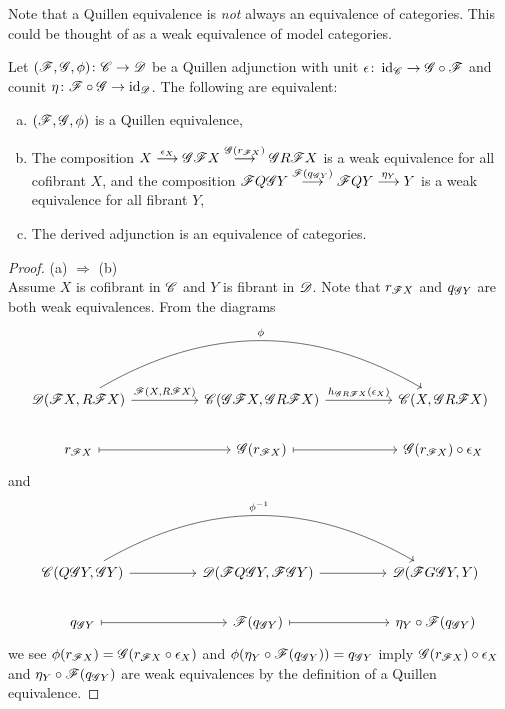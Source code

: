 \documentclass[10pt]{amsart}
\begin{document}
\begin{rmk}
  Note that a Quillen equivalence is {\it not} always an equivalence of categories.
  This could be thought of as a weak equivalence of model categories.
\end{rmk}

\begin{prop}
  Let $(\mathscr{F}, \mathscr{G}, \phi) \colon \mathscr{C} \to \mathscr{D}$ be a Quillen adjunction with unit $\epsilon \colon \operatorname{id}_{\mathscr{C}} \to \mathscr{G} \circ \mathscr{F}$ and counit $\eta \colon \mathscr{F} \circ \mathscr{G} \to \operatorname{id}_{\mathscr{D}}$.
  The following are equivalent:
  \begin{enumerate}[(a)]
  \item
    $(\mathscr{F}, \mathscr{G}, \phi)$ is a Quillen equivalence,
  \item
    The composition 
    $X \overset{\epsilon_X}\longrightarrow \mathscr{G} \mathscr{F} X \overset{\mathscr{G}(r_{\mathscr{F} X})}\longrightarrow \mathscr{G} R \mathscr{F} X$
    is a weak equivalence for all cofibrant $X$, and the composition
    $\mathscr{F} Q \mathscr{G} Y \overset{\mathscr{F}(q_{\mathscr{G} Y})}\longrightarrow \mathscr{F} Q Y \overset{\eta_Y}\longrightarrow Y$ is a weak equivalence for all fibrant $Y$,
  \item
    The derived adjunction is an equivalence of categories.
  \end{enumerate}

  \begin{proof}
    (a) $\Rightarrow$ (b)\\
    Assume $X$ is cofibrant in $\mathscr{C}$ and $Y$ is fibrant in $\mathscr{D}$.
    Note that $r_{\mathscr{F} X}$ and $q_{\mathscr{G} Y}$ are both weak equivalences.
    From the diagrams
    $$\begin{tikzcd}      
      \D(\F X, R \F X)\arrow{rr}{\F(X, R \F X)}\arrow[bend left]{rrrr}{\phi} 
      && 
      \C(\G \F X, \G R \F X) \arrow{rr}{h_{\G R \F X}(\epsilon_X)} && 
      \C(X, \G R \F X)\\
      r_{\F X} \arrow[mapsto]{rr} && \G(r_{\F X}) \arrow[mapsto]{rr} & & \G(r_{\F X}) \circ \epsilon _X
    \end{tikzcd}$$
    and
    $$\begin{tikzcd}
      \C(Q\G Y, \G Y) \arrow{rr}\arrow[bend left]{rrrr}{\phi^{-1}} && \D(\F Q \G Y, \F \G Y) \arrow{rr} && \D(\F G \G Y, Y)\\
      q_{\G Y} \arrow[mapsto]{rr} && \F(q_{\G Y}) \arrow[mapsto]{rr} && \eta_{Y} \circ \F(q_{\G Y})
    \end{tikzcd}$$
    we see $\phi(r_{\mathscr{F} X}) = \mathscr{G}(r_{\mathscr{F} X} \circ \epsilon_X)$ and $\phi(\eta_Y \circ \mathscr{F}(q_{\mathscr{G} Y})) = q_{\mathscr{G} Y}$ imply $\mathscr{G}(r_{\mathscr{F} X}) \circ \epsilon_X$ and $\eta_Y \circ \mathscr{F}(q_{\mathscr{G} Y})$ are weak equivalences by the definition of a Quillen equivalence.
    

\end{proof}
\end{prop}
\end{document}

